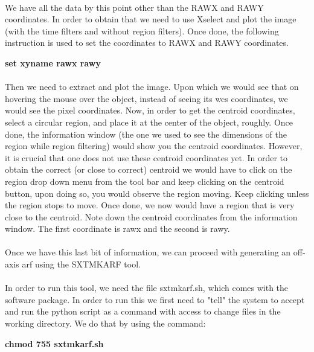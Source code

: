 \documentclass[a4paper,twoside]{report}
\numberwithin{equation}{section}
\begin{document}
\paragraph{}
We have all the data by this point other than the RAWX and RAWY coordinates. In order to obtain that we need to use Xselect and plot the image (with the time filters and without region filters). Once done, the following instruction is used to set the coordinates to RAWX and RAWY coordinates.
\begin{center}
\item \large \textbf{set xyname rawx rawy}
\end{center}
\paragraph{}
Then we need to extract and plot the image. Upon which we would see that on hovering the mouse over the object, instead of seeing its wcs coordinates, we would see the  pixel coordinates. Now, in order to get the centroid coordinates, select a circular region, and place it at the center of the object, roughly. Once done, the information window (the one we used to see the dimensions of the region while region filtering) would show you the centroid coordinates. However, it is crucial that one does not use these centroid coordinates yet. In order to obtain the correct (or close to correct) centroid we would have to click on the region drop down menu from the tool bar and keep clicking on the centroid button, upon doing so, you would observe the region moving. Keep clicking unless the region stops to move. Once done, we now would have a region that is very close to the centroid. Note down the centroid coordinates from the information window. The first coordinate is rawx and the second is rawy. 
\paragraph{}
Once we have this last bit of information, we can proceed with generating an off-axis arf using the SXTMKARF tool. 
\paragraph{}
In order to run this tool, we need the file sxtmkarf.sh, which comes with the software package. In order to run this we first need to "tell" the system to accept and run the python script as a command with access to change files in the working directory. We do that by using the command: 
\begin{center}
\item \large \textbf{chmod 755 sxtmkarf.sh}
\end{center}
\end{document}
